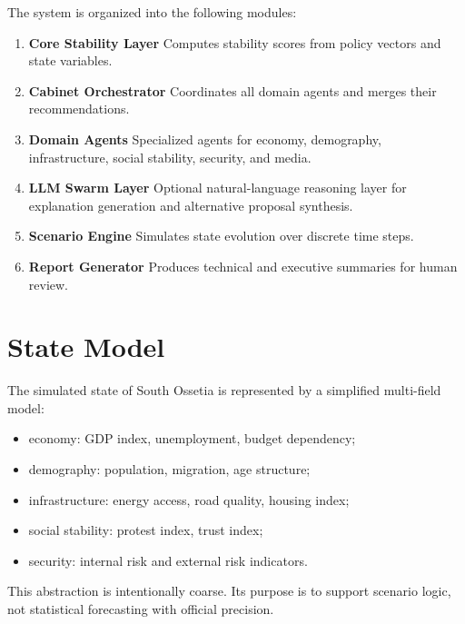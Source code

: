\documentclass[11pt,a4paper]{article}
\begin{document}
The system is organized into the following modules:

\begin{enumerate}[leftmargin=1.5em]
    \item \textbf{Core Stability Layer}  
    Computes stability scores from policy vectors and state variables.

    \item \textbf{Cabinet Orchestrator}  
    Coordinates all domain agents and merges their recommendations.

    \item \textbf{Domain Agents}  
    Specialized agents for economy, demography, infrastructure, social stability, security, and media.

    \item \textbf{LLM Swarm Layer}  
    Optional natural-language reasoning layer for explanation generation and alternative proposal synthesis.

    \item \textbf{Scenario Engine}  
    Simulates state evolution over discrete time steps.

    \item \textbf{Report Generator}  
    Produces technical and executive summaries for human review.
\end{enumerate}

\section{State Model}

The simulated state of South Ossetia is represented by a simplified multi-field model:

\begin{itemize}[leftmargin=1.5em]
    \item economy: GDP index, unemployment, budget dependency;
    \item demography: population, migration, age structure;
    \item infrastructure: energy access, road quality, housing index;
    \item social stability: protest index, trust index;
    \item security: internal risk and external risk indicators.
\end{itemize}

This abstraction is intentionally coarse. Its purpose is to support scenario logic, not statistical forecasting with official precision.
\end{document}
